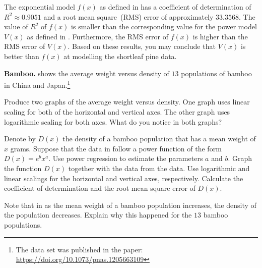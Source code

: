 \documentclass[a4paper,oneside,12pt]{article}
\begin{document}
{\begin{solution}
The exponential model $f(x)$ as defined in
 has a
coefficient of determination of $R^2 \approx 0.9051$ and a root mean
square~(RMS) error of approximately $33.3568$.  The value of $R^2$ of
$f(x)$ is smaller than the corresponding value for the power model
$V(x)$ as defined in .
Furthermore, the RMS error of $f(x)$ is higher than the RMS error of
$V(x)$.  Based on these results, you may conclude that $V(x)$ is
better than $f(x)$ at modelling the shortleaf pine data.
\end{solution}
}{}

\begin{table}[!htbp]
\centering

\caption{%
  The average weight versus density of $13$ populations of bamboo.
  Each average weight is measured in grams and is the mean of the
  weight of the shoots of a bamboo population.  The density of a
  population of bamboo is defined as the number of bamboo shoots per
  square metre.
}
\label{tab:logarithm:bamboo}
\end{table}

\begin{exercise}
\textbf{Bamboo.}
 shows the average weight versus density
of $13$ populations of bamboo in China and Japan.\footnote{
  The data set was published in the paper:
  \url{https://doi.org/10.1073/pnas.1205663109}
}
\begin{packedenum}
\item\label{subex:logarithm:bamboo_linear_log}
  Produce two graphs of the average weight versus density.  One graph
  uses linear scaling for both of the horizontal and vertical axes.
  The other graph uses logarithmic scaling for both axes.  What do you
  notice in both graphs?

\item\label{subex:logarithm:bamboo_power_regression}
  Denote by $D(x)$ the density of a bamboo population that has a mean
  weight of $x$ grams.  Suppose that the data in
   follow a power function of the form
  $D(x) = e^b x^a$.  Use power regression to estimate the parameters
  $a$ and $b$.  Graph the function $D(x)$ together with the data from
  the data.  Use logarithmic and linear scalings for the horizontal
  and vertical axes, respectively.  Calculate the coefficient of
  determination and the root mean square error of $D(x)$.

\item\label{subex:logarithm:bamboo_explain}
  Note that in  as the mean weight of a
  bamboo population increases, the density of the population
  decreases.  Explain why this happened for the $13$ bamboo
  populations.
\end{packedenum}
\end{exercise}
\end{document}
